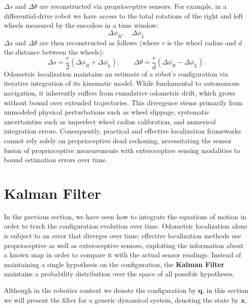 \documentclass[10pt, a4paper]{report}
\newcommand{\q}{{\mathbf q}}
\begin{document}
$\Delta s$ and $\Delta \theta$ are reconstructed via proprioceptive sensors. For example, in a differential-drive robot we have access to the total rotations of the right and left wheels measured by the encoders in a time window:\begin{equation}
    \Delta\phi_R,\quad\Delta\phi_L 
\end{equation}
$\Delta s$ and $\Delta \theta$ are then reconstructed as follows (where $r$ is the wheel radius and $d$ the distance between the wheels):\begin{equation}
    \Delta s = \frac{r}{2} (\Delta \phi_R + \Delta \phi_L), \qquad \Delta \theta = \frac{r}{d} (\Delta \phi_R - \Delta \phi_L).
\end{equation}
Odometric localization maintains an estimate of a robot's configuration via iterative integration of its kinematic model. While fundamental to autonomous navigation, it inherently suffers from cumulative odometric drift, which grows without bound over extended trajectories. This divergence stems primarily from unmodeled physical perturbations such as wheel slippage, systematic uncertainties such as imperfect wheel radius calibration, and numerical integration errors. Consequently, practical and effective localization frameworks cannot rely solely on proprioceptive dead reckoning, necessitating the sensor fusion of proprioceptive measurements with exteroceptive sensing modalities to bound estimation errors over time.
\section{Kalman Filter}
In the previous section, we have seen how to integrate the equations of motion in order to track the configuration evolution over time. Odometric localization alone is subject to an error that diverges over time; effective localization methods use proprioceptive as
well as exteroceptive sensors, exploiting the information about a known map in order to compare it with the actual sensor readings. Instead of maintaining a single
hypothesis on the configuration, the \textbf{Kalman Filter} maintains a probability
distribution over the space of all possible hypotheses.\bigskip

Although in the robotics context we denote the configuration by $\q$,
in this section we will present the filter for a generic dynamical system, denoting the state by $\mathbf x$.
\end{document}
